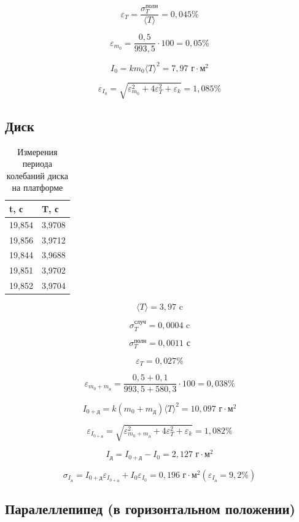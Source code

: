 \documentclass[a4paper, 12pt]{article}
\begin{document}
\[ \varepsilon_T = \frac{\sigma_T^{\text{полн}}}{\langle T \rangle} = 0,045\%\]

\[\varepsilon_{m_0} = \frac{0,5}{993,5} \cdot 100 = 0,05\%\]

\[ I_0 = km_0 {\langle T \rangle}^2 = 7,97 \text{ г}\cdot\text{м}^2\]

\[ \varepsilon_{I_0} = \sqrt{\varepsilon_{m_0}^2 + 4\varepsilon_T^2 + \varepsilon_k} = 1,085\%\]

\subsection*{Диск}

\begin{table}
    \centering
    \begin{tabular}{|l|l|}
    \hline
        t, с & T, с \\ \hline
        19,854 & 3,9708 \\ \hline
        19,856 & 3,9712 \\ \hline
        19,844 & 3,9688 \\ \hline
        19,851 & 3,9702 \\ \hline
        19,852 & 3,9704 \\ \hline
    \end{tabular}
    \caption{Измерения периода колебаний диска на платформе}
\end{table}

\[ \langle T \rangle = 3,97 \text{ c}\]

\[\sigma_T^{\text{случ}} = 0,0004 \text{ c}\]

\[\sigma_T^{\text{полн}} = 0,0011 \text{ с}\]

\[\varepsilon_T = 0,027\% \]

\[\varepsilon_{m_0+m_\text{д}} = \frac{0,5+0,1}{993,5+580,3} \cdot 100 = 0,038\%\]

\[ I_{0+\text{д}} = k(m_0+m_\text{д}) {\langle T \rangle}^2 = 10,097 \text{ г}\cdot\text{м}^2\]

\[ \varepsilon_{I_{0+\text{д}}} = \sqrt{\varepsilon_{m_0+m_\text{д}}^2 + 4\varepsilon_T^2 + \varepsilon_k} = 1,082\%\]

\[ I_\text{д} = I_{0+\text{д}} - I_0 = 2,127 \text{ г}\cdot\text{м}^2\]

\[ \sigma_{I_\text{д}} = I_{0+\text{д}}\varepsilon_{I_{0+\text{д}}} + I_0\varepsilon_{I_0} = 0,196 \text{ г}\cdot\text{м}^2 (\varepsilon_{I_\text{д}} = 9,2\%) \]

\subsection*{Паралеллепипед (в горизонтальном положении)}
\end{document}
